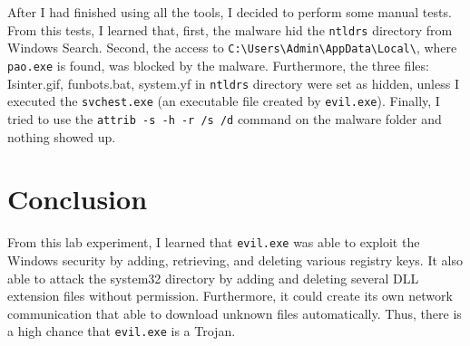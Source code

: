 \documentclass[letterpaper,10pt,titlepage,draftclsnofoot,onecolumn]{IEEEtran}
\begin{document}
After I had finished using all the tools, I decided to perform some manual tests. 
From this tests, I learned that, first, the malware hid the \verb|ntldrs| directory from Windows Search. 
Second, the access to \verb|C:\Users\Admin\AppData\Local\|, where \verb|pao.exe| is found, was blocked by the malware. 
Furthermore, the three files: Isinter.gif, funbots.bat, system.yf in \verb|ntldrs| directory were set as hidden, unless I executed the \verb|svchest.exe| (an executable file created by \verb|evil.exe|).  
Finally, I tried to use the \verb|attrib -s -h -r /s /d| command on the malware folder and nothing showed up. 

\section{Conclusion}

From this lab experiment, I learned that \verb|evil.exe| was able to exploit the Windows security by adding, retrieving, and deleting various registry keys. 
It also able to attack the system32 directory by adding and deleting several DLL extension files without permission. 
Furthermore, it could create its own network communication that able to download unknown files automatically. 
Thus, there is a high chance that \verb|evil.exe| is a Trojan. 
\end{document}
